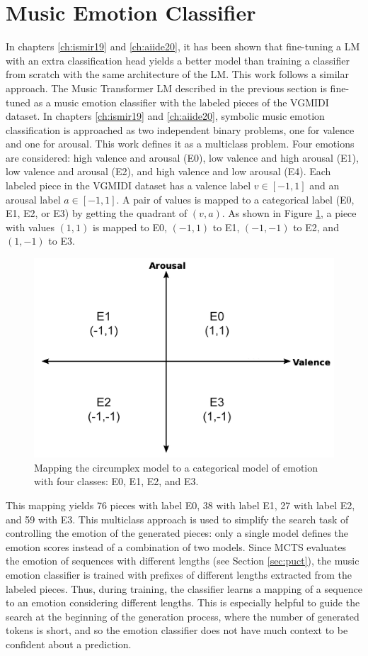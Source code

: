 \section{Music Emotion Classifier}
\label{sec:emotion_classifier}

In chapters \ref{ch:ismir19} and \ref{ch:aiide20}, it has been shown that fine-tuning a LM with an extra classification head yields a better model than training a classifier from scratch with the same architecture of the LM. This work follows a similar approach. The Music Transformer LM described in the previous section is fine-tuned as a music emotion classifier with the labeled pieces of the VGMIDI dataset. In chapters \ref{ch:ismir19} and \ref{ch:aiide20}, symbolic music emotion classification is approached as two independent binary problems, one for valence and one for arousal. This work defines it as a multiclass problem. Four emotions are considered: high valence and arousal (E0), low valence and high arousal (E1), low valence and arousal (E2), and high valence and low arousal (E4). Each labeled piece in the VGMIDI dataset has a valence label $v \in [-1, 1]$ and an arousal label $a \in [-1, 1]$. A pair of values is mapped to a categorical label (E0, E1, E2, or E3) by getting the quadrant of $(v,a)$. As shown in Figure \ref{fig:va_mapping}, a piece with values $(1,1)$ is mapped to E0, $(-1,1)$ to E1, $(-1,-1)$ to E2, and $(1, -1)$ to E3.

\begin{figure}
 \centering
 \includegraphics[width=0.7\columnwidth]{imgs/ismir21/circumplex.png}
 \caption{Mapping the circumplex model to a categorical model of emotion with four classes: E0, E1, E2, and E3.}
 \label{fig:va_mapping}
\end{figure}

This mapping yields 76 pieces with label E0, 38 with label E1, 27 with label E2, and 59 with E3. This multiclass approach is used to simplify the search task of controlling the emotion of the generated pieces: only a single model defines the emotion scores instead of a combination of two models. Since MCTS evaluates the emotion of sequences with different lengths (see Section \ref{sec:puct}), the music emotion classifier is trained with prefixes of different lengths extracted from the labeled pieces. Thus, during training, the classifier learns a mapping of a sequence to an emotion considering different lengths. This is especially helpful to guide the search at the beginning of the generation process, where the number of generated tokens is short, and so the emotion classifier does not have much context to be confident about a prediction.

